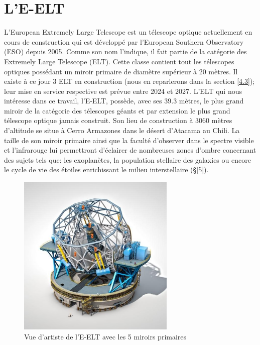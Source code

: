 

\chapter{L'E-ELT}\label{4}

L'European Extremely Large Telescope est un télescope optique actuellement en cours de construction qui est développé par l'European Southern Observatory (ESO) depuis 2005. Comme son nom l'indique, il fait partie de la catégorie des Extremely Large Telescope (ELT). Cette classe contient tout les télescopes optiques possédant un miroir primaire de diamètre supérieur à 20 mètres. Il existe à ce jour 3 ELT en construction (nous en reparlerons dans la section \ref{4.3}); leur mise en service respective est prévue entre 2024 et 2027. L'ELT qui nous intéresse dans ce travail, l'E-ELT, possède, avec ses 39.3 mètres, le plus grand miroir de la catégorie des télescopes géants et par extension le plus grand télescope optique jamais construit. Son lieu de construction à 3060 mètres d'altitude se situe à Cerro Armazones dans le désert d'Atacama au Chili. La taille de son miroir primaire ainsi que la faculté d'observer dans le spectre visible et l'infrarouge lui permettront d'éclairer de nombreuses zones d'ombre concernant des sujets tels que: les exoplanètes, la population stellaire des galaxies ou encore le cycle de vie des étoiles enrichissant le milieu interstellaire (§\ref{5}).

\begin{figure}[H]
	\centering
	\includegraphics[scale=1.35]{images/e-elt_i}
	\caption[Vue d'artiste de l'E-ELT avec les 5 miroirs primaires \label{Fig. 4.1}]{Vue d'artiste de l'E-ELT avec les 5 miroirs primaires}
	\label{Fig. 4.1}
\end{figure}

